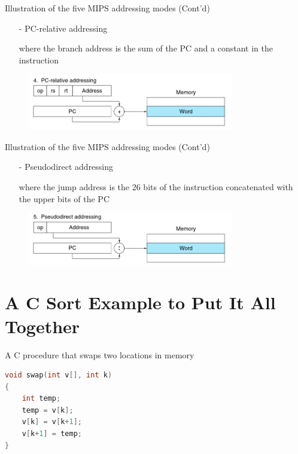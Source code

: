 \begin{frame}{Illustration of the five MIPS addressing modes (Cont'd)}
    
\begin{itemize}
\item[-] PC-relative addressing

where the branch address is the sum of the PC and a
constant in the instruction
\end{itemize}

\begin{figure}
\begin{center}
\includegraphics[width=0.8\textwidth, height=0.45\textheight]{docs/images/addr-4}
\end{center}
\end{figure}
\end{frame}
\begin{frame}{Illustration of the five MIPS addressing modes (Cont'd)}

\begin{itemize}
\item[-] Pseudodirect addressing

where the jump address is the 26 bits of the instruction concatenated with the upper bits of the PC
\end{itemize}

\begin{figure}
\begin{center}
\includegraphics[width=0.8\textwidth, height=0.4\textheight]{docs/images/addr-5}
\end{center}
\end{figure}
\end{frame}

\section{A C Sort Example to Put It All Together}
\begin{frame}[fragile]{A C procedure that swaps two locations in memory}
\begin{lstlisting}[language=c, keywordstyle=\color{purple}\textbf]
void swap(int v[], int k)
{
    int temp;
    temp = v[k];
    v[k] = v[k+1];
    v[k+1] = temp;
}
\end{lstlisting}
\end{frame}

